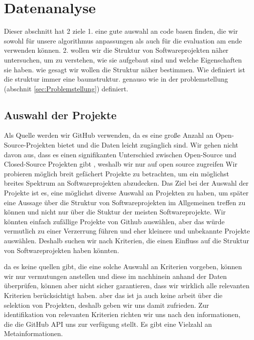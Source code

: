 \chapter{Datenanalyse} \label{sec:datenAnalyse}
Dieser abschnitt hat 2 ziele 1. eine gute auswahl an code basen finden, die wir sowohl für unsere algorithmus anpassungen als auch für die evaluation am ende verwenden können.
2. wollen wir die Struktur von Softwareprojekten näher untersuchen, um zu verstehen, wie sie aufgebaut sind und welche Eigenschaften sie haben.
wie gesagt wir wollen die Struktur näher bestimmen. Wie definiert ist die struktur immer eine baumstruktur. genauso wie in der problemstellung (abschnit \ref{sec:Problemstellung}) definiert.


\section{Auswahl der Projekte} \label{sec:auswahlDerProjekte}
Als Quelle werden wir GitHub verwenden, da es eine große Anzahl an Open-Source-Projekten bietet und die Daten leicht zugänglich sind.
Wir gehen nicht davon aus, dass es einen signifikanten Unterschied zwischen Open-Source und Closed-Source Projekten gibt \cite{closedVsOpenSource, closedVsOpenSource2}, weshalb wir nur auf open source zugreifen 
Wir probieren möglich breit gefächert Projekte zu betrachten, um ein möglichst breites Spektrum an Softwareprojekten abzudecken. 
Das Ziel bei der Auswahl der Projekte ist es, eine möglichst diverse Auswahl an Projekten zu haben, um später eine Aussage über die Struktur von Softwareprojekten im Allgemeinen treffen zu können und nicht nur über die Stuktur der meisten Softwareprojekte. Wir könnten einfach zufällige Projekte von Github auswählen, aber das würde vermutlich zu einer Verzerrung führen und eher kleinere und unbekannte Projekte auswählen.
Deshalb suchen wir nach Kriterien, die einen Einfluss auf die Struktur von Softwareprojekten haben könnten. 

da es keine quellen gibt, die eine solche Auswahl an Kriterien vorgeben, können wir nur vermutungen anstellen und diese im nachhinein anhand der Daten überprüfen, können aber nicht sicher garantieren, dass wir wirklich alle relevanten Kriterien berücksichtigt haben. aber das ist ja auch keine arbeit über die selektion von Projekten, deshalb geben wir uns damit zufrieden.
Zur identifikation von relevanten Kriterien richten wir uns nach den informationen, die die GitHub API uns zur verfügung stellt. Es gibt eine Vielzahl an Metainformationen. 

